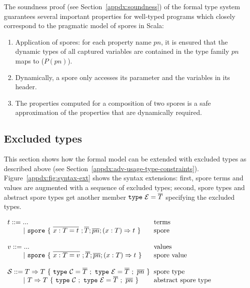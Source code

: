 The soundness proof (see Section~\ref{appdx:soundness}) of the formal type system
guarantees several important properties for well-typed programs which closely
correspond to the pragmatic model of spores in Scala:

\begin{enumerate}

\item Application of spores: for each property name $pn$, it is ensured that the dynamic types of all captured variables are contained in the type family $pn$ maps to ($P(pn)$).

\item Dynamically, a spore only accesses its parameter and the variables in its header.

\item The properties computed for a composition of two spores is a safe approximation of the properties that are dynamically required.

\end{enumerate}


\subsection{Excluded types}

This section shows how the formal model can be extended with excluded types as
described above (see Section~\ref{appdx:adv-usage-type-constraints}).
Figure~\ref{appdx:fig:syntax-ext} shows the syntax extensions: first, spore terms and
values are augmented with a sequence of excluded types; second, spore types and
abstract spore types get another member $\texttt{type}~\mathcal{E} = \overline{T}$
specifying the excluded types.

\begin{figure*}[ht!]
  \centering

  $\ba[t]{l@{\hspace{2mm}}l}
t ::=     ...                               & \mbox{terms}
\\
\gap ~|~  \texttt{spore}~\{~\seq{x : T = t}~; \seq{T}; \seq{pn} ; (x: T) \Rightarrow t~\}  & \mbox{spore}
\\
 & \\
v ::=     ...                               & \mbox{values}
\\
\gap ~|~  \texttt{spore}~\{~\seq{x : T = v}~; \seq{T}; \seq{pn} ; (x: T) \Rightarrow t~\}  & \mbox{spore value}
\\
 & \\
\mathcal{S} ::= T \Rightarrow T~\{~\texttt{type}~\mathcal{C} = \seq{T}~;~\texttt{type}~\mathcal{E} = \seq{T}~;~\seq{pn}~\}   & \mbox{spore type}
\\
\gap ~|~  T \Rightarrow T~\{~\texttt{type}~\mathcal{C}~;~\texttt{type}~\mathcal{E} = \seq{T}~;~\seq{pn}~\}   & \mbox{abstract spore type}
\\
\ea$

  \caption{Core language syntax extensions}
  \label{appdx:fig:syntax-ext}
\end{figure*}

